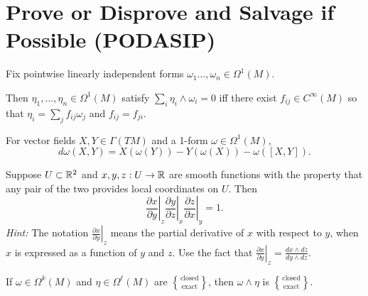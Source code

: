 \documentclass{homework}
\begin{document}
\section{Prove or Disprove and Salvage if Possible (PODASIP)}

\begin{problem} Fix pointwise linearly independent forms $\omega_1
\ldots, \omega_n \in \Omega^1(M)$.

  Then $\eta_1, \ldots, \eta_n \in \Omega^1(M)$ satisfy $\sum_i \eta_i \wedge \omega_i = 0$ iff there exist $f_{ij} \in C^\infty(M)$ so that $\eta_i = \sum_j f_{ij} \omega_j$ and $f_{ij} = f_{ji}$.
\end{problem}

\begin{problem} For vector fields $X, Y \in \Gamma(TM)$ and a 1-form
$\omega \in \Omega^1(M)$,
\[
  d\omega(X,Y) = X(\omega (Y)) - Y(\omega(X)) - \omega([X,Y]).
\]
\end{problem}

\begin{problem} Suppose $U \subset \mathbb{R}^2$ and $x,y,z: U \to \mathbb{R}$ are
smooth functions with the property that any pair of the two provides
local coordinates on $U$.  Then
  \[
    \left. \frac{\partial x}{\partial y} \right|_{z} 
    \left. \frac{\partial y}{\partial z} \right|_{x} 
    \left. \frac{\partial z}{\partial x} \right|_{y} = 1. %
  \] \textit{Hint:} The notation $\left. \frac{\partial x}{\partial y}
\right|_{z}$ means the partial derivative of $x$ with respect to $y$,
when $x$ is expressed as a function of $y$ and $z$.  Use the fact that
$\left. \frac{\partial x}{\partial y} \right|_{z} = \frac{dx \wedge
dz}{dy \wedge dz}$.
\end{problem}

\newcommand{\respectively}[2]{$\genfrac\{\}{0pt}{0}{\mbox{#1}}{\mbox{#2}}$}

\begin{problem} If $\omega \in \Omega^k(M)$ and $\eta \in
\Omega^{\ell}(M)$ are \respectively{closed}{exact}, then $\omega
\wedge \eta$ is \respectively{closed}{exact}.
\end{problem}
\end{document}
